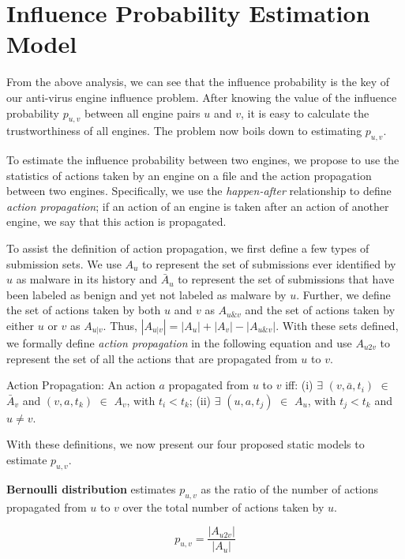 \vspace{-0.05in}
\section{Influence Probability Estimation Model}
\label{sec:influenceprob}



From the above analysis, we can see that the influence probability is the key of our anti-virus engine
influence problem.
After knowing the value of the influence probability $p_{u,v}$ between all engine pairs $u$ and $v$,
it is easy to calculate the trustworthiness of all engines.
The problem now boils down to estimating $p_{u,v}$.

To estimate the influence probability between two engines, we propose to use the statistics of actions taken by
an engine on a file and the action propagation between two engines. 
Specifically, we use the {\em happen-after} relationship to
define {\em action propagation}; if an action of an engine is taken after an action of another engine, we say that
this action is propagated.

To assist the definition of action propagation, we first define a few types of submission sets.
We use $A_u$ to represent the set of submissions ever identified by $u$ as malware in its history
and $\bar{A}_u$ to represent the set of submissions that have been labeled as benign and yet not labeled as malware by $u$.
Further, we define the set of actions taken by both $u$ and $v$ as $A_{u\&v}$ 
and the set of actions taken by either $u$ or $v$ as $A_{u|v}$.
Thus, $|A_{u|v}| =   |A_u| + |A_v| - |A_{u\&v}|$.
With these sets defined, we formally
define {\em action propagation} in the following equation 
and use $A_{u2v}$ to represent the set of all the actions that are propagated from $u$ to $v$. 

Action Propagation:
An action $a$ propagated from $u$ to $v$ iff: (i) $\exists$ $(v, \bar{a}, t_i)$ $\in$ $\bar{A}_v$ 
and $(v, a, t_k)$ $\in$ $A_v$, with $t_i < t_k$; (ii) $\exists$ $(u, a, t_j)$ $\in$ $A_u$, with $t_j < t_k$ and $u \neq v$. 


With these definitions, we now present our four proposed static models to estimate $p_{u,v}$.

{\bf Bernoulli distribution} estimates $p_{u,v}$ as the ratio of the number of actions 
propagated from $u$ to $v$ over the total number of actions taken by $u$.

$$p_{u,v} = \frac{|A_{u2v}|}{|A_u|}$$ 

